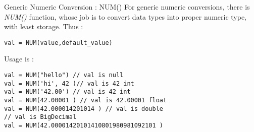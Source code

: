 \begin{section}{Generic Numeric Conversion : NUM()}
For generic numeric conversions, there is \emph{NUM()} function,
whose job is to convert data types into proper numeric type, 
with least storage. Thus :

\begin{lstlisting}[style=JexlStyle]
val = NUM(value,default_value)
\end{lstlisting}

Usage is :
\begin{center}\begin{minipage}{\linewidth}
\begin{lstlisting}[style=JexlStyle]
val = NUM("hello") // val is null
val = NUM('hi', 42 )// val is 42 int
val = NUM('42.00') // val is 42 int 
val = NUM(42.00001 ) // val is 42.00001 float 
val = NUM(42.000014201014 ) // val is double 
// val is BigDecimal
val = NUM(42.00001420101410801980981092101 )  
\end{lstlisting}
\end{minipage}\end{center}


\end{section}


